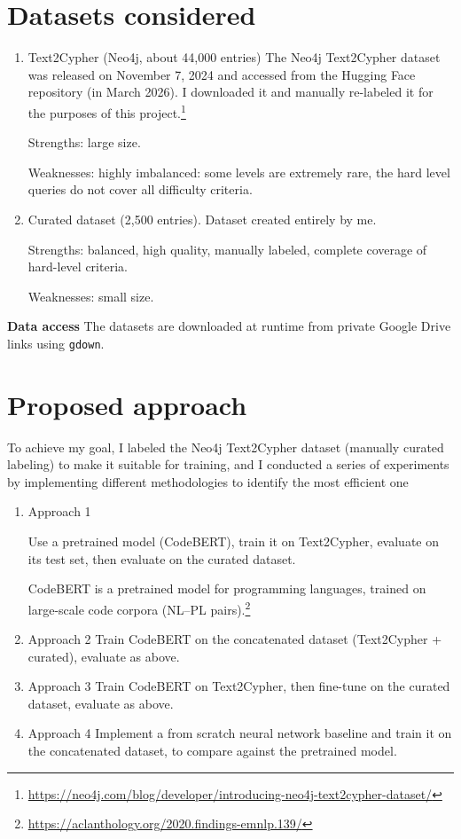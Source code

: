 \documentclass{article}
\begin{document}
\section{Datasets considered}
\begin{enumerate}
\item Text2Cypher (Neo4j, about 44,000 entries)
The Neo4j Text2Cypher dataset was released on November 7, 2024 and accessed from the Hugging Face repository (in March 2026). I downloaded it and manually re-labeled it for the purposes of this project.\footnote{\url{https://neo4j.com/blog/developer/introducing-neo4j-text2cypher-dataset/}}

Strengths: large size.

Weaknesses: highly imbalanced: some levels are extremely rare, the hard level queries do not cover all difficulty criteria.

\item Curated dataset (2,500 entries).
Dataset created entirely by me.

Strengths: balanced, high quality, manually labeled, complete coverage of hard-level criteria.

Weaknesses: small size.

\end{enumerate}

\textbf{Data access} The datasets are downloaded at runtime from private Google Drive links using \texttt{gdown}. 



\section{Proposed approach}

To achieve my goal, I labeled the Neo4j Text2Cypher dataset (manually curated labeling) to make it suitable for training,  and I conducted a series of experiments by implementing different methodologies to identify the most efficient one

\begin{enumerate}
\item Approach 1

Use a pretrained model (CodeBERT), train it on Text2Cypher, evaluate on its test set, then evaluate on the curated dataset.

CodeBERT is a pretrained model for programming languages, trained on large-scale code corpora (NL--PL pairs).\footnote{\url{https://aclanthology.org/2020.findings-emnlp.139/}}


\item Approach 2
Train CodeBERT on the concatenated dataset (Text2Cypher + curated), evaluate as above.

\item Approach 3
Train CodeBERT on Text2Cypher, then fine-tune on the curated dataset, evaluate as above.

\item Approach 4
Implement a from scratch neural network baseline and train it on the concatenated dataset, to compare against the pretrained model.

\end{enumerate}
\end{document}

